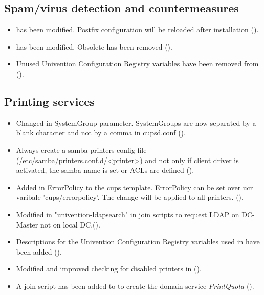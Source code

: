 \subsection{Spam/virus detection and countermeasures}
\begin{itemize}

\item {} has been modified. Postfix
configuration will be reloaded after installation ().

\item {} has been modified. Obsolete
 has been removed ().

\item Unused Univention Configuration Registry variables have been removed
from  ().

\end{itemize}


\subsection{Printing services}
\begin{itemize}
\item Changed in  SystemGroup parameter. SystemGroups are now separated by a blank character and not by a comma in cupsd.conf ().

\item Always create a samba printers config file
(/etc/samba/printers.conf.d/<printer>) and not only if client driver is
activated, the samba name is set or ACLs are defined ().

\item Added in  ErrorPolicy to the cups template. ErrorPolicy can be set over ucr varibale 'cups/errorpolicy'. The change will be applied to all printers. ().

\item Modified in  "univention-ldapsearch" in join scripts to request LDAP on DC-Master not on local DC.().

\item Descriptions for the Univention Configuration Registry variables used in
 have been added ().

\item Modified and improved checking for disabled printers in   ().

\item A join script has been added to  to
create the domain service \emph{PrintQuota} ().

\end{itemize}

